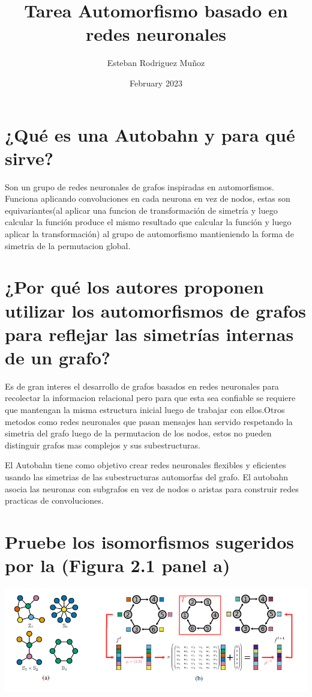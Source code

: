 \documentclass{article}
\title{Tarea Automorfismo basado en redes neuronales}
\author{Esteban Rodriguez Muñoz }
\date{February 2023}
\begin{document}
\maketitle

\section{¿Qué es una Autobahn y para qué sirve?}
Son un grupo de redes neuronales de grafos inspiradas en automorfismos. Funciona aplicando convoluciones en cada neurona en vez de nodos, estas son equivariantes(al aplicar una funcion de transformación de simetría y luego calcular la función produce el mismo resultado que calcular la función y luego aplicar la transformación) al grupo de automorfismo mantieniendo la forma de simetria de la permutacion global.

\section{ ¿Por qué los autores proponen utilizar los automorfismos de grafos para reflejar las simetrías internas de un grafo?}
Es de gran interes el desarrollo de grafos basados en redes neuronales para recolectar la informacion relacional pero para que esta sea confiable se requiere que mantengan la misma estructura inicial luego de trabajar con ellos.Otros metodos como redes neuronales que pasan mensajes han servido respetando la simetria del grafo luego de la permutacion de los nodos, estos no pueden distinguir grafos mas complejos y sus subestructuras.

El Autobahn tiene como objetivo crear redes neuronales flexibles y eficientes usando las simetrias de las subestructuras automorfas del grafo. El autobahn asocia las neuronas con subgrafos en vez de nodos o aristas para construir redes practicas de convoluciones.



\section{Pruebe los isomorfismos sugeridos por la (Figura 2.1 panel a)}


\includegraphics[scale=0.7]{grafos}
\end{document}
